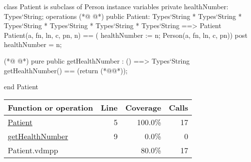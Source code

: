 \begin{vdmpp}[breaklines=true]
class Patient is subclass of Person
instance variables
  private healthNumber: Types`String;
operations
(*@
\label{Patient:5}
@*)
 public Patient: Types`String * Types`String * Types`String * Types`String * Types`String * Types`String ==> Patient
  Patient(a, fn, ln, c, pn, n) == ( healthNumber := n; Person(a, fn, ln, c, pn))
 post healthNumber = n;
 
(*@
\label{getHealthNumber:9}
@*)
 pure public getHealthNumber : () ==> Types`String
  getHealthNumber() == (return (*@@*));

end Patient
\end{vdmpp}
\bigskip
\begin{longtable}{|l|r|r|r|}
\hline
Function or operation & Line & Coverage & Calls \\
\hline
\hline
\hyperref[Patient:5]{Patient} & 5&100.0\% & 17 \\
\hline
\hyperref[getHealthNumber:9]{getHealthNumber} & 9&0.0\% & 0 \\
\hline
\hline
Patient.vdmpp & & 80.0\% & 17 \\
\hline
\end{longtable}

